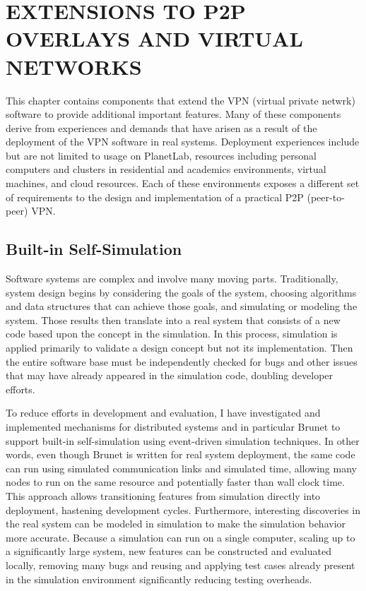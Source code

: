 \chapter{EXTENSIONS TO P2P OVERLAYS AND VIRTUAL NETWORKS}
\label{chap:extensions}

This chapter contains components that extend the VPN (virtual private netwrk)
software to provide additional important features.  Many of these components
derive from experiences and demands that have arisen as a result of the
deployment of the VPN software in real systems.  Deployment experiences include
but are not limited to usage on PlanetLab, resources including personal
computers and clusters in residential and academics environments, virtual
machines, and cloud resources.  Each of these environments exposes a different
set of requirements to the design and implementation of a practical P2P
(peer-to-peer) VPN.

\section{Built-in Self-Simulation}

Software systems are complex and involve many moving parts.  Traditionally,
system design begins by considering the goals of the system, choosing
algorithms and data structures that can achieve those goals, and simulating or
modeling the system.  Those results then translate into a real system that
consists of a new code based upon the concept in the simulation.  In this
process, simulation is applied primarily to validate a design concept but not
its implementation.  Then the entire software base must be independently
checked for bugs and other issues that may have already appeared in the
simulation code, doubling developer efforts.  

To reduce efforts in development and evaluation, I have investigated and
implemented mechanisms for distributed systems and in particular Brunet to
support built-in self-simulation using event-driven simulation techniques.  In
other words, even though Brunet is written for real system deployment, the same
code can run using simulated communication links and simulated time, allowing
many nodes to run on the same resource and potentially faster than wall clock
time.  This approach allows transitioning features from simulation directly
into deployment, hastening development cycles.  Furthermore, interesting
discoveries in the real system can be modeled in simulation to make the
simulation behavior more accurate.  Because a simulation can run on a single
computer, scaling up to a significantly large system, new features can be
constructed and evaluated locally, removing many bugs and reusing and applying
test cases already present in the simulation environment significantly reducing
testing overheads.

